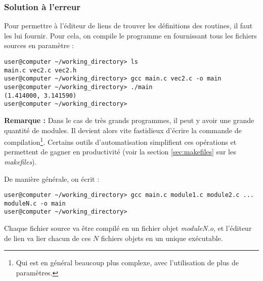 \documentclass[../../../main.tex]{subfiles}
\begin{document}
\subsubsection{Solution à l'erreur}
\label{ssub:solution_l_erreur}
Pour permettre à l'éditeur de liens de trouver les définitions des routines, il faut les lui fournir. Pour cela, on compile le programme en fournissant tous les fichiers sources en paramètre :
\begin{verbatim}
user@computer ~/working_directory> ls
main.c vec2.c vec2.h
user@computer ~/working_directory> gcc main.c vec2.c -o main
user@computer ~/working_directory> ./main
(1.414000, 3.141590)
user@computer ~/working_directory>
\end{verbatim}
\textbf{Remarque :} Dans le cas de très grands programmes, il peut y avoir une grande quantité de modules. Il devient alors vite fastidieux d'écrire la commande de compilation\footnote{Qui est en général beaucoup plus complexe, avec l'utilisation de plus de paramètres.}. Certains outils d'automatisation simplifient ces opérations et permettent de gagner en productivité (voir la section \ref{sec:makefiles} sur les \textit{makefiles}).
 
De manière générale, on écrit :
\begin{verbatim}
user@computer ~/working_directory> gcc main.c module1.c module2.c ... moduleN.c -o main
user@computer ~/working_directory>
\end{verbatim}
Chaque fichier source va être compilé en un fichier objet \textit{moduleN.o}, et l'éditeur de lien va lier chacun de ces $N$ fichiers objets en un unique exécutable. 
\end{document}
